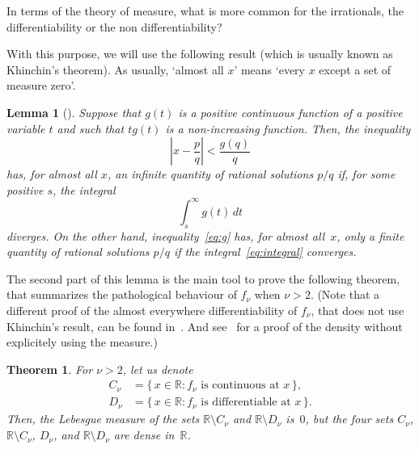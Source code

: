 \documentclass[11pt,a4paper,reqno]{amsart}
\def\R{\mathbb{R}}
\theoremstyle{plain}
\newtheorem{lemma}{Lemma}
\newtheorem{theorem}{Theorem}
\theoremstyle{definition}
\begin{document}
In terms of the theory of measure, what is more common for the irrationals, the differentiability or the non differentiability? 

With this purpose, we will use the following result
(which is usually known as Khinchin's theorem).
As usually, `almost all $x$' means `every $x$ except a set of measure zero'.

\begin{lemma}[{\cite[Theorem 32, page 69]{Khinchin}}]
\label{lem:g}
Suppose that $g(t)$ is a positive continuous function of a positive variable $t$ and such that $tg(t)$ is a non-increasing function. Then, the inequality
\begin{equation}
\label{eq:g}
  \left| x - \frac{p}{q} \right| < \frac{g(q)}{q}
\end{equation}
has, for almost all $x$, an infinite quantity of rational solutions $p/q$
if, for some positive $s$, the integral
\begin{equation}
\label{eq:integral}
  \int_{s}^{\infty} g(t)\, dt
\end{equation}
diverges. On the other hand, inequality~\eqref{eq:g} has, for almost all~$x$, only a finite quantity of rational solutions $p/q$ if the integral~\eqref{eq:integral} converges.
\end{lemma}

The second part of this lemma is the main tool to prove the following theorem, that summarizes the pathological behaviour of $f_\nu$ when $\nu > 2$.
(Note that a different proof of the almost everywhere differentiability of $f_\nu$, that does not use Khinchin's result, can be found in~\cite{DaTa}. And see~\cite{He} for a proof of the density without explicitely using the measure.)

\begin{theorem}
For $\nu > 2$, let us denote
\begin{align*}
  C_\nu &= \{\,x \in \R : f_\nu \text{ is continuous at } x\,\},\\
  D_\nu &= \{\,x \in \R : f_\nu \text{ is differentiable at } x\,\}.
\end{align*}
Then, the Lebesgue measure of the sets $\R \setminus C_\nu$ and $\R \setminus D_\nu$ is~$0$,
but the four sets $C_\nu$, $\R \setminus C_\nu$, $D_\nu$, and $\R \setminus D_\nu$
are dense in~$\R$.
\end{theorem}
\end{document}
